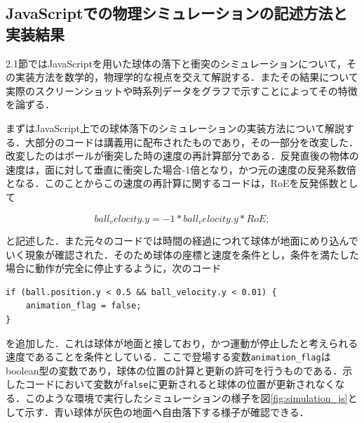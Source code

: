 \documentclass[12pt, xelatex,ja=standard,jafont=hiragino]{bxjsarticle}
\newif\ifdraft
\begin{document}
\subsection{JavaScriptでの物理シミュレーションの記述方法と実装結果}
\ifdraft
2.1節では球の落下と衝突のシミュレーションの数学的な計算方法と、JavaScriptでの実装の方法について、数式や図表、コードの一部を交えて説明する。また、結果のCGのスクリーンショット、さらに、球の落下を示すシミュレーションの結果を時系列のグラフで示し、その特徴を論述する。

記述方法は、レポートを読んだ第三者が理解し、それを実装することができる十分な情報が含まれている（再現できる）必要がある。たとえばソースコードが提供されている場合はそのソースコードの参照方法などを含む必要がある。

レポートに用いるグラフ等は、工学的に正しいグラフであることが求められる。線のタイプ、軸のラベル、凡例、単位などに留意すること。また、十分に高い解像度である必要がある。グラフを画面に表示し、そのスクリーンショットをそのまま使う解像度の低い図面や、画面をカメラで撮影したようなものは認められない。グラフはラスター形式（jpg, pngなど）の画像ファイルの場合、十分に高い解像度（150dpi以上）とすること。おすすめはPostScriptやSVG, PDFなどのベクター形式としてグラフを出力することである。
\fi
2.1節ではJavaScriptを用いた球体の落下と衝突のシミュレーションについて，その実装方法を数学的，物理学的な視点を交えて解説する．またその結果について実際のスクリーンショットや時系列データをグラフで示すことによってその特徴を論ずる．

まずはJavaScript上での球体落下のシミュレーションの実装方法について解説する．大部分のコードは講義用に配布されたものであり，その一部分を改変した．改変したのはボールが衝突した時の速度の再計算部分である．反発直後の物体の速度は，面に対して垂直に衝突した場合-1倍となり，かつ元の速度の反発系数倍となる．このことからこの速度の再計算に関するコードは，RoEを反発係数として

\begin{equation}
    ball_velocity.y = -1 * ball_velocity.y * RoE;
\end{equation}

と記述した．また元々のコードでは時間の経過につれて球体が地面にめり込んでいく現象が確認された．そのため球体の座標と速度を条件とし，条件を満たした場合に動作が完全に停止するように，次のコード

\begin{lstlisting}
if (ball.position.y < 0.5 && ball_velocity.y < 0.01) {
	animation_flag = false;
}
\end{lstlisting}
を追加した．これは球体が地面と接しており，かつ運動が停止したと考えられる速度であることを条件としている．ここで登場する変数\verb|animation_flag|はboolean型の変数であり，球体の位置の計算と更新の許可を行うものである．示したコードにおいて変数が\verb|false|に更新されると球体の位置が更新されなくなる．このような環境で実行したシミュレーションの様子を図\ref{fig:simulation_js}として示す．青い球体が灰色の地面へ自由落下する様子が確認できる．
\end{document}
